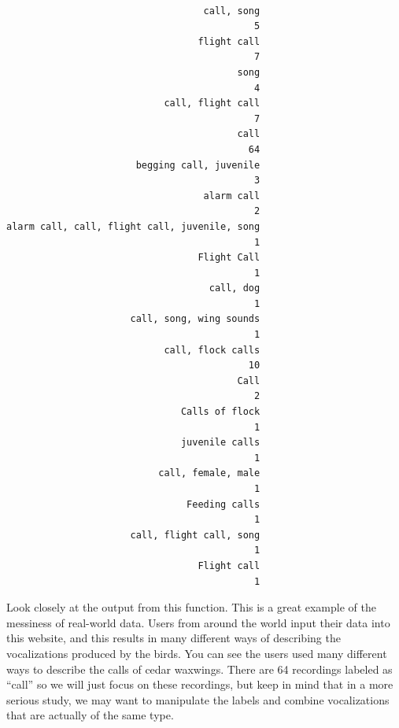 \documentclass[]{krantz}
\begin{document}
\begin{verbatim}

                                   call, song 
                                            5 
                                  flight call 
                                            7 
                                         song 
                                            4 
                            call, flight call 
                                            7 
                                         call 
                                           64 
                       begging call, juvenile 
                                            3 
                                   alarm call 
                                            2 
alarm call, call, flight call, juvenile, song 
                                            1 
                                  Flight Call 
                                            1 
                                    call, dog 
                                            1 
                      call, song, wing sounds 
                                            1 
                            call, flock calls 
                                           10 
                                         Call 
                                            2 
                               Calls of flock 
                                            1 
                               juvenile calls 
                                            1 
                           call, female, male 
                                            1 
                                Feeding calls 
                                            1 
                      call, flight call, song 
                                            1 
                                  Flight call 
                                            1 
\end{verbatim}

Look closely at the output from this function. This is a great example
of the messiness of real-world data. Users from around the world input
their data into this website, and this results in many different ways of
describing the vocalizations produced by the birds. You can see the
users used many different ways to describe the calls of cedar waxwings.
There are 64 recordings labeled as ``call'' so we will just focus on
these recordings, but keep in mind that in a more serious study, we may
want to manipulate the labels and combine vocalizations that are
actually of the same type.
\end{document}
